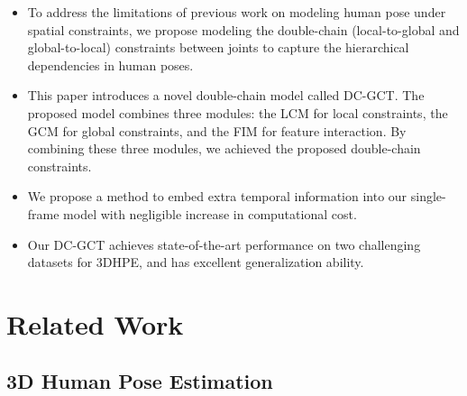 \documentclass[journal]{IEEEtran}
\begin{document}
\begin{itemize}
\item To address the limitations of previous work on modeling human pose under spatial constraints, we propose modeling the double-chain (local-to-global and global-to-local) constraints between joints to capture the hierarchical dependencies in human poses.

\item This paper introduces a novel double-chain model called DC-GCT. The proposed model combines three modules: the LCM for local constraints, the GCM for global constraints, and the FIM for feature interaction. By combining these three modules, we achieved the proposed double-chain constraints.
\item We propose a method to embed extra temporal information into our single-frame model with negligible increase in computational cost.

  \item Our DC-GCT achieves state-of-the-art performance on two challenging datasets for 3DHPE, and has excellent generalization ability.

\end{itemize}



\section{Related Work}

\subsection{3D Human Pose Estimation}
\end{document}
